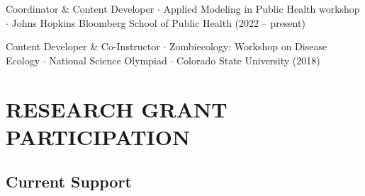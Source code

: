 \documentclass{cv}
\begin{document}
Coordinator \& Content Developer $\cdot$ Applied Modeling in Public Health workshop $\cdot$ Johns Hopkins Bloomberg School of Public Health (2022 -- present)

Content Developer \& Co-Instructor $\cdot$ Zombiecology: Workshop on Disease Ecology $\cdot$ National Science Olympiad $\cdot$ Colorado State University (2018)








\newpage
{}
\partthree



\section*{RESEARCH GRANT PARTICIPATION}

\subsection*{Current Support}
\end{document}
